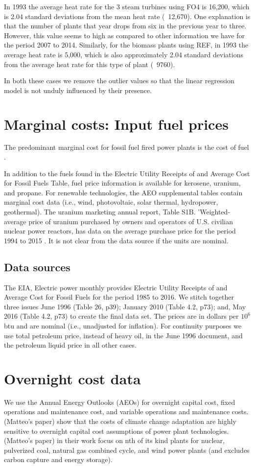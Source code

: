\documentclass[10pt]{report}
\begin{document}
In 1993 the average heat rate for the 3 steam turbines using FO4 is 16,200, which is 2.04 standard deviations from the mean heat rate (~12,670). One explanation is that the number of plants that year drops from six in the previous year to three. However, this value seems to high as compared to other information we have for the period 2007 to 2014. Similarly, for the biomass plants using REF, in 1993 the average heat rate is 5,000, which is also approximately 2.04 standard deviations from the average heat rate for this type of plant (~9760). 

In both these cases we remove the outlier values so that the linear regression model is not unduly influenced by their presence. 

\chapter{Marginal costs: Input fuel prices}
The predominant marginal cost for fossil fuel fired power plants is the cost of fuel \parencite{}. 

In addition to the fuels found in the Electric Utility Receipts of and Average Cost for Fossil Fuels Table, fuel price information is available for kerosene, uranium, and propane.
For renewable technologies, the AEO supplemental tables contain marginal cost data (i.e., wind, photovoltaic, solar thermal, hydropower, geothermal).
The uranium marketing annual report, Table S1B. 'Weighted-average price of uranium purchased by owners and operators of U.S. civilian nuclear power reactors, has data on the average purchase price for the period 1994 to 2015 \parencite{eiauranium2016}. 
It is not clear from the data source if the units are nominal. 

\section{Data sources}
The EIA, Electric power monthly provides Electric Utility Receipts of and Average Cost for Fossil Fuels for the period 1985 to 2016.
We stitch together three issues June 1996 (Table 26, p39); January 2010 (Table 4.2, p73); and, 
May 2016 (Table 4.2, p73) to create the final data set.
The prices are in dollars per $10^6$ btu and are nominal (i.e., unadjusted for inflation).
For continuity purposes we use total petroleum price, instead of heavy oil, in the June 1996 document, and the petroleum liquid price in all other cases.



\chapter{Overnight cost data}
We use the Annual Energy Outlooks (AEOs) for overnight capital cost, fixed operations and maintenance cost, and variable operations and maintenance costs. 
\cite{} (Matteo's paper) show that the costs of climate change adaptation are highly sensitive to overnight capital cost assumptions of power plant technologies. 
\cite{} (Matteo's paper) in their work focus on nth of its kind plants for nuclear, pulverized coal, natural gas combined cycle, and wind power plants (and excludes carbon capture and energy storage). 
\end{document}
